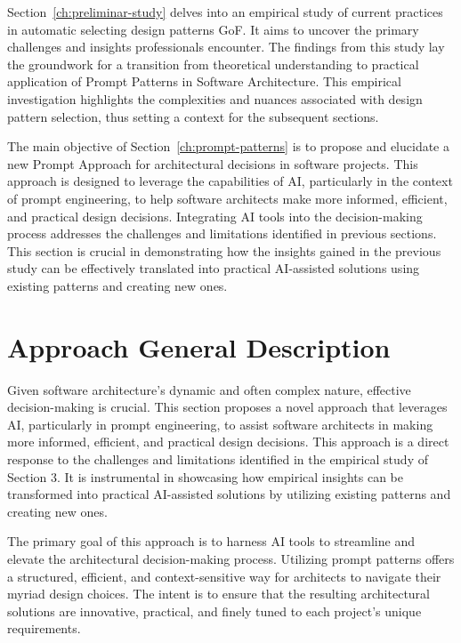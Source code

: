 Section~\ref{ch:preliminar-study} delves into an empirical study of current practices in automatic selecting design patterns GoF. It aims to uncover the primary challenges and insights professionals encounter. The findings from this study lay the groundwork for a transition from theoretical understanding to practical application of Prompt Patterns in Software Architecture. This empirical investigation highlights the complexities and nuances associated with design pattern selection, thus setting a context for the subsequent sections.

The main objective of Section~\ref{ch:prompt-patterns} is to propose and elucidate a new Prompt Approach for architectural decisions in software projects. This approach is designed to leverage the capabilities of AI, particularly in the context of prompt engineering, to help software architects make more informed, efficient, and practical design decisions. Integrating AI tools into the decision-making process addresses the challenges and limitations identified in previous sections. This section is crucial in demonstrating how the insights gained in the previous study can be effectively translated into practical AI-assisted solutions using existing patterns and creating new ones.
\section{Approach General Description}

Given software architecture's dynamic and often complex nature, effective decision-making is crucial. This section proposes a novel approach that leverages AI, particularly in prompt engineering, to assist software architects in making more informed, efficient, and practical design decisions. This approach is a direct response to the challenges and limitations identified in the empirical study of Section 3. It is instrumental in showcasing how empirical insights can be transformed into practical AI-assisted solutions by utilizing existing patterns and creating new ones.


The primary goal of this approach is to harness AI tools to streamline and elevate the architectural decision-making process. Utilizing prompt patterns offers a structured, efficient, and context-sensitive way for architects to navigate their myriad design choices. The intent is to ensure that the resulting architectural solutions are innovative, practical, and finely tuned to each project's unique requirements.

